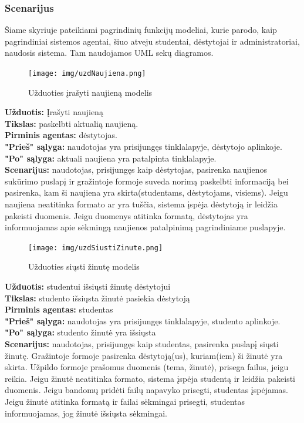 \documentclass{VUMIFPSkursinis}
\begin{document}
\subsubsection{Scenarijus}
Šiame skyriuje pateikiami pagrindinių funkcijų modeliai, kurie parodo, kaip pagrindiniai sistemos agentai, šiuo atveju studentai, dėstytojai ir administratoriai, naudosis sistema. Tam naudojamos UML sekų diagramos.
\begingroup
\begin{figure}[H]
\centering
\texttt{[image: img/uzdNaujiena.png]}
\caption{Užduoties įrašyti naujieną modelis}
\label{fig:rnaujiena}
\end{figure}
\setlength{\parindent}{0pt}\textbf{Užduotis: } Įrašyti naujieną\\
\textbf{Tikslas: } paskelbti aktualią naujieną.\\
\textbf{Pirminis agentas: } dėstytojas.\\
\textbf{"Prieš" sąlyga: } naudotojas yra prisijungęs tinklalapyje, dėstytojo aplinkoje.\\
\textbf{"Po" sąlyga: } aktuali naujiena yra patalpinta tinklalapyje.\\
\textbf{Scenarijus: } naudotojas, prisijungęs kaip dėstytojas, pasirenka naujienos sukūrimo puslapį ir gražintoje formoje suveda norimą paskelbti informaciją bei pasirenka, kam ši naujiena yra skirta(studentams, dėstytojams, visiems). Jeigu naujiena neatitinka formato ar yra tuščia, sistema įspėja dėstytoją ir leidžia pakeisti duomenis. Jeigu duomenys atitinka formatą, dėstytojas yra informuojamas apie sėkmingą naujienos patalpinimą pagrindiniame puslapyje.
\begin{figure}[H]
\centering
\texttt{[image: img/uzdSiustiZinute.png]}
\caption{Užduoties siųsti žinutę modelis}
\label{fig:zinute}
\end{figure}
\textbf{Užduotis: } studentui išsiųsti žinutę dėstytojui\\
\textbf{Tikslas: } studento išsiųsta žinutė pasiekia dėstytoją\\
\textbf{Pirminis agentas: } studentas\\
\textbf{"Prieš" sąlyga: } naudotojas yra prisijungęs tinklalapyje, studento aplinkoje.\\
\textbf{"Po" sąlyga: } studento žinutė yra išsiųsta\\
\textbf{Scenarijus: } naudotojas, prisijungęs kaip studentas, pasirenka puslapį siųsti žinutę. Gražintoje formoje pasirenka dėstytoją(us), kuriam(iem) ši žinutė yra skirta. Užpildo formoje prašomus duomenis (tema, žinutė), prisega failus, jeigu reikia. Jeigu žinutė neatitinka formato, sistema įspėja studentą ir leidžia pakeisti duomenis. Jeigu bandomų pridėti failų napavyko prisegti, studentas įspėjamas. Jeigu žinutė atitinka formatą ir failai sėkmingai prisegti, studentas informuojamas, jog žinutė išsiųsta sėkmingai.
\end{document}
